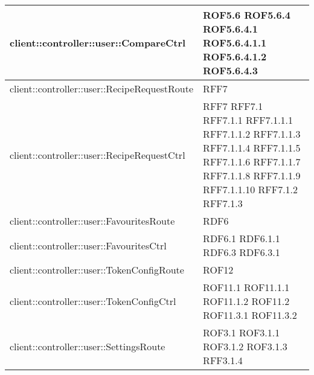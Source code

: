 \begin{center}
\begin{longtable}{| p{11cm} | p{2.5cm} |}
\hline
client::controller::user::CompareCtrl & ROF5.6 \newline ROF5.6.4 \newline ROF5.6.4.1 \newline ROF5.6.4.1.1 \newline ROF5.6.4.1.2 \newline ROF5.6.4.3 \\
\hline
client::controller::user::RecipeRequestRoute & RFF7 \\
\hline
client::controller::user::RecipeRequestCtrl & RFF7 \newline RFF7.1 \newline RFF7.1.1 \newline RFF7.1.1.1 \newline RFF7.1.1.2 \newline RFF7.1.1.3 \newline RFF7.1.1.4 \newline RFF7.1.1.5 \newline RFF7.1.1.6 \newline RFF7.1.1.7 \newline RFF7.1.1.8 \newline RFF7.1.1.9 \newline RFF7.1.1.10 \newline RFF7.1.2 \newline RFF7.1.3 \\
\hline
client::controller::user::FavouritesRoute & RDF6 \\
\hline
client::controller::user::FavouritesCtrl & RDF6.1 \newline RDF6.1.1 \newline RDF6.3 \newline RDF6.3.1 \\
\hline
client::controller::user::TokenConfigRoute & ROF12 \\
\hline
client::controller::user::TokenConfigCtrl & ROF11.1 \newline ROF11.1.1 \newline ROF11.1.2 \newline ROF11.2 \newline ROF11.3.1 \newline ROF11.3.2 \\
\hline
client::controller::user::SettingsRoute & ROF3.1 \newline ROF3.1.1 \newline ROF3.1.2 \newline ROF3.1.3 \newline RFF3.1.4 \\

\end{longtable}
\end{center}
